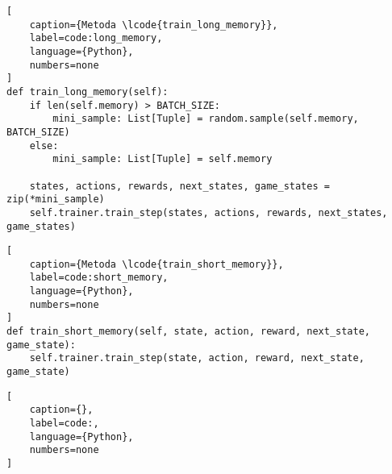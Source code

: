 \begin{onepage}
    \begin{lstlisting}[
    caption={Metoda \lcode{train_long_memory}},
    label=code:long_memory,
    language={Python},
    numbers=none
]
def train_long_memory(self):
    if len(self.memory) > BATCH_SIZE:
        mini_sample: List[Tuple] = random.sample(self.memory, BATCH_SIZE)
    else:
        mini_sample: List[Tuple] = self.memory

    states, actions, rewards, next_states, game_states = zip(*mini_sample)
    self.trainer.train_step(states, actions, rewards, next_states, game_states)

\end{lstlisting}
\end{onepage}

\begin{onepage}
    \begin{lstlisting}[
    caption={Metoda \lcode{train_short_memory}},
    label=code:short_memory,
    language={Python},
    numbers=none
]
def train_short_memory(self, state, action, reward, next_state, game_state):
    self.trainer.train_step(state, action, reward, next_state, game_state)

    \end{lstlisting}
\end{onepage}


\begin{onepage}
    \begin{lstlisting}[
    caption={},
    label=code:,
    language={Python},
    numbers=none
]

    \end{lstlisting}
\end{onepage}
